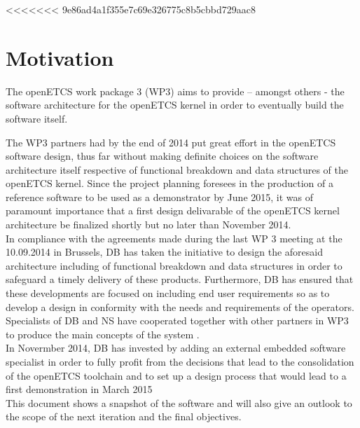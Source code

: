 <<<<<<< 9e86ad4a1f355e7c69e326775c8b5cbbd729aac8
%
\section{Motivation}
The openETCS work package 3 (WP3) aims to provide – amongst others - the software architecture for the openETCS kernel in order to eventually build the software itself. 

The WP3  partners had by the end of 2014 put great effort in the openETCS software design, thus far without making definite choices on the software architecture itself respective of functional breakdown and data structures of the openETCS kernel. Since the project planning foresees in the production of a reference software to be used as a demonstrator by June 2015, it was of paramount importance that a first design delivarable of the openETCS kernel architecture be finalized shortly but no later than November 2014.\\

In compliance with the agreements made during the last WP 3 meeting at the 10.09.2014 in Brussels, DB has taken the initiative to design the aforesaid architecture including of functional breakdown and data structures in order to safeguard a timely delivery of these products. Furthermore, DB has ensured that these developments are focused on including end user requirements so as to develop a design in conformity with the needs and requirements of the operators. Specialists of DB and NS have cooperated together with other partners in WP3 to produce the main concepts of the system .\\

In Novermber 2014, DB has invested by adding an external embedded software specialist in order to fully profit from the decisions that lead to the consolidation of the openETCS toolchain and to set up a design process that would lead to a first demonstration in March 2015\\

This document shows a snapshot of the software and will also give an outlook to the scope of the next iteration and the final objectives.\\


